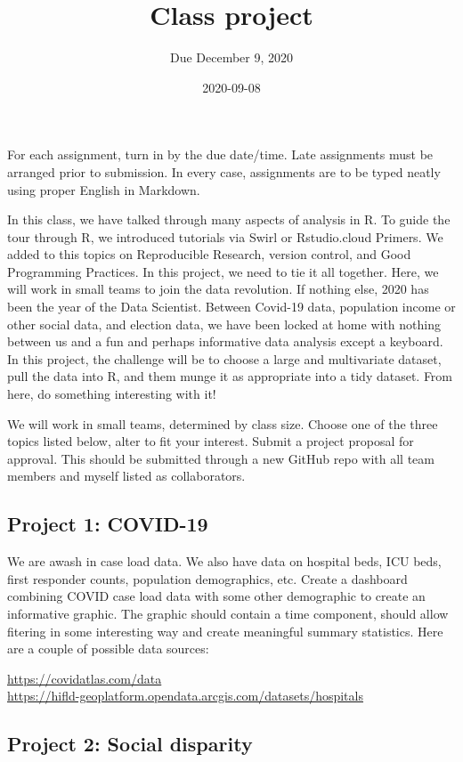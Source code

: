 \documentclass[]{article}
\title{Class project}
\subtitle{Due December 9, 2020}
\author{}
\date{\vspace{-2.5em}2020-09-08}
\begin{document}
\maketitle

For each assignment, turn in by the due date/time. Late assignments must
be arranged prior to submission. In every case, assignments are to be
typed neatly using proper English in Markdown.

In this class, we have talked through many aspects of analysis in R. To
guide the tour through R, we introduced tutorials via Swirl or
Rstudio.cloud Primers. We added to this topics on Reproducible Research,
version control, and Good Programming Practices. In this project, we
need to tie it all together. Here, we will work in small teams to join
the data revolution. If nothing else, 2020 has been the year of the Data
Scientist. Between Covid-19 data, population income or other social
data, and election data, we have been locked at home with nothing
between us and a fun and perhaps informative data analysis except a
keyboard. In this project, the challenge will be to choose a large and
multivariate dataset, pull the data into R, and them munge it as
appropriate into a tidy dataset. From here, do something interesting
with it!

We will work in small teams, determined by class size. Choose one of the
three topics listed below, alter to fit your interest. Submit a project
proposal for approval. This should be submitted through a new GitHub
repo with all team members and myself listed as collaborators.

\hypertarget{project-1-covid-19}{%
\subsection{Project 1: COVID-19}\label{project-1-covid-19}}

We are awash in case load data. We also have data on hospital beds, ICU
beds, first responder counts, population demographics, etc. Create a
dashboard combining COVID case load data with some other demographic to
create an informative graphic. The graphic should contain a time
component, should allow fitering in some interesting way and create
meaningful summary statistics. Here are a couple of possible data
sources:

\url{https://covidatlas.com/data}\\
\url{https://hifld-geoplatform.opendata.arcgis.com/datasets/hospitals}

\hypertarget{project-2-social-disparity}{%
\subsection{Project 2: Social
disparity}\label{project-2-social-disparity}}
\end{document}
